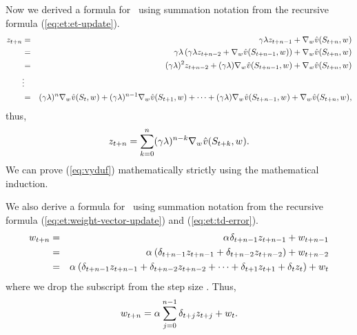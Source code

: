 Now we derived a formula for \ using summation notation from the recursive formula (\ref{eq:et:et-update}).
\begin{eqnarray*}
z_{t+n} &=& \gamma \lambda z_{t+n-1} + \nabla_{w_{}} \hat{v}(S_{t+n},w_{})
\\
&=& \gamma \lambda \left(
\gamma \lambda z_{t+n-2} + \nabla_{w_{}} \hat{v}(S_{t+n-1},w_{})
\right)
+ \nabla_{w_{}} \hat{v}(S_{t+n},w_{})
\\
&=& (\gamma \lambda )^2 z_{t+n-2} + (\gamma \lambda) \nabla_{w_{}} \hat{v}(S_{t+n-1},w_{})
+ \nabla_{w_{}} \hat{v}(S_{t+n},w_{})
\\
&\vdots&
\\
&=& (\gamma \lambda )^{n} \nabla_{w_{}} \hat{v}(S_{t},w_{})
+ (\gamma \lambda)^{n-1} \nabla_{w_{}} \hat{v}(S_{t+1},w_{})
+ \cdots
+ (\gamma \lambda) \nabla_{w_{}} \hat{v}(S_{t+n-1},w_{})
+ \nabla_{w_{}} \hat{v}(S_{t+n},w_{}),
\end{eqnarray*}
thus,
\begin{equation}
\label{eq:vyduf}
z_{t+n} = \sum_{k=0}^n (\gamma \lambda)^{n-k} \nabla_{w_{}} \hat{v}(S_{t+k},w_{}).
\end{equation}
We can prove (\ref{eq:vyduf}) mathematically strictly using the mathematical induction.

We also derive a formula for \ using summation notation from the recursive formula (\ref{eq:et:weight-vector-update})
and (\ref{eq:et:td-error}).
\begin{eqnarray*}
w_{t+n} &=& \alpha_{} \delta_{t+n-1} z_{t+n-1} + w_{t+n-1}
\\
&=& \alpha_{} \left( \delta_{t+n-1} z_{t+n-1} + \delta_{t+n-2} z_{t+n-2} \right) + w_{t+n-2}
\\
&=& \alpha_{} \left(
\delta_{t+n-1} z_{t+n-1} + \delta_{t+n-2} z_{t+n-2} + \cdots + \delta_{t+1} z_{t+1} + \delta_{t} z_{t}
\right)
+ w_{t}
\end{eqnarray*}
where we drop the subscript from the step size .
Thus,
\begin{equation}
\label{eq:nuasdk}
w_{t+n} = \alpha_{} \sum_{j=0}^{n-1}  \delta_{t+j} z_{t+j} + w_{t}.
\end{equation}

